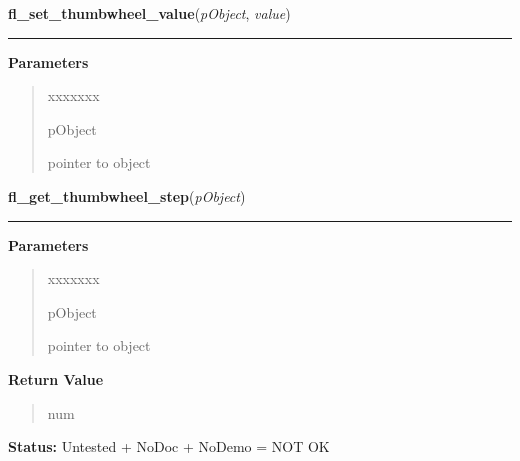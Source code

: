 \hspace{.8\funcindent}\begin{boxedminipage}{\funcwidth}

    \raggedright \textbf{fl\_set\_thumbwheel\_value}(\textit{pObject}, \textit{value})

    \vspace{-1.5ex}

    \rule{\textwidth}{0.5\fboxrule}
\setlength{\parskip}{2ex}
\setlength{\parskip}{1ex}
      \textbf{Parameters}
      \vspace{-1ex}

      \begin{quote}
        \begin{Ventry}{xxxxxxx}

          \item[pObject]

          pointer to object

        \end{Ventry}

      \end{quote}

    \end{boxedminipage}

    \label{xformslib:library:fl_get_thumbwheel_step}

    \vspace{0.5ex}

\hspace{.8\funcindent}\begin{boxedminipage}{\funcwidth}

    \raggedright \textbf{fl\_get\_thumbwheel\_step}(\textit{pObject})

    \vspace{-1.5ex}

    \rule{\textwidth}{0.5\fboxrule}
\setlength{\parskip}{2ex}
\setlength{\parskip}{1ex}
      \textbf{Parameters}
      \vspace{-1ex}

      \begin{quote}
        \begin{Ventry}{xxxxxxx}

          \item[pObject]

          pointer to object

        \end{Ventry}

      \end{quote}

      \textbf{Return Value}
    \vspace{-1ex}

      \begin{quote}
      num

      \end{quote}

\textbf{Status:} Untested + NoDoc + NoDemo = NOT OK



    \end{boxedminipage}

